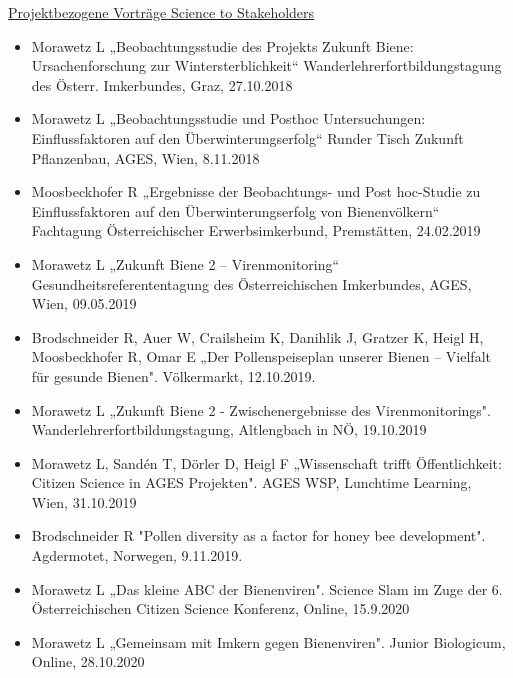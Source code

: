 \underline{Projektbezogene Vorträge Science to Stakeholders}

\begin{itemize}
    \item 
    Morawetz L „Beobachtungsstudie des Projekts Zukunft Biene: Ursachenforschung zur Wintersterblichkeit“ Wanderlehrerfortbildungstagung des Österr. Imkerbundes, Graz, 27.10.2018

    \item 
    Morawetz L „Beobachtungsstudie und Posthoc Untersuchungen: Einflussfaktoren auf den Überwinterungserfolg“ Runder Tisch Zukunft Pflanzenbau, AGES, Wien, 8.11.2018

    \item 
    Moosbeckhofer R „Ergebnisse der Beobachtungs- und Post hoc-Studie zu Einflussfaktoren auf den Überwinterungserfolg von Bienenvölkern“ Fachtagung Österreichischer Erwerbsimkerbund, Premstätten, 24.02.2019

    \item 
    Morawetz L „Zukunft Biene 2 – Virenmonitoring“ Gesundheitsreferententagung des Österreichischen Imkerbundes, AGES, Wien, 09.05.2019
    
    \item 
    Brodschneider R, Auer W, Crailsheim K, Danihlik J, Gratzer K, Heigl H, Moosbeckhofer R, Omar E „Der Pollenspeiseplan unserer Bienen – Vielfalt für gesunde Bienen". Völkermarkt, 12.10.2019.
    
    \item
    Morawetz L „Zukunft Biene 2 - Zwischenergebnisse des Virenmonitorings".  Wanderlehrerfortbildungstagung, Altlengbach in NÖ, 19.10.2019
    
    \item
    Morawetz L, Sandén T, Dörler D, Heigl F „Wissenschaft trifft Öffentlichkeit: Citizen Science in AGES Projekten". AGES WSP, Lunchtime Learning, Wien, 31.10.2019
    
    \item 
    Brodschneider R "Pollen diversity as a factor for honey bee development". Agdermotet, Norwegen, 9.11.2019.
    
    \item
    Morawetz L „Das kleine ABC der Bienenviren". Science Slam im Zuge der 6. Österreichischen Citizen Science Konferenz, Online, 15.9.2020
    
    \item
    Morawetz L „Gemeinsam mit Imkern gegen Bienenviren". Junior Biologicum, Online, 28.10.2020
    
\end{itemize}

